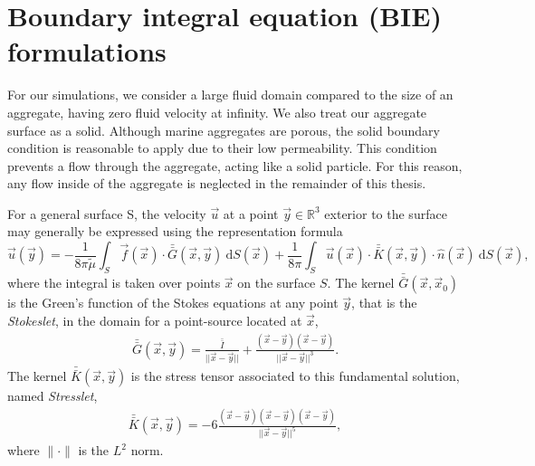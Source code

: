 \section{Boundary integral equation (BIE) formulations} 
For our simulations, we consider a large fluid domain compared to the size of an aggregate, having zero fluid velocity at infinity. We also treat our aggregate surface as a solid. Although marine aggregates are porous, the solid boundary condition is reasonable to apply due to their low permeability. 
This condition prevents a flow through the aggregate, acting like a solid particle. For this reason, any flow inside of the aggregate is neglected in the remainder of this thesis.  
\par
For a general surface S, the velocity $\vec{u}$ at a point $\vec{y}\in \mathbb{R}^3$ exterior to the surface may generally be expressed using the representation formula \cite{pozrikidis_boundary_1992}
\begin{equation}
   \vec{u}(\vec{y}) =
	- \frac{1}{8 \pi {\tilde{\mu}}} \int_S  \vec{f}(\vec{x}) \cdot \bar{\bar{G}}(\vec{x},\vec{y}) \ \text{d}S(\vec{x}) 
+ \frac{1}{8 \pi} \int_S
\vec{u}(\vec{x}) \cdot  \bar{\bar{K}}(\vec{x},\vec{y})  
\cdot \hat{n} ( \vec{x})
\ \text{d}S(\vec{x}),
\label{eq_BIE}
\end{equation}
where the integral is taken over points $\vec{x}$ on the surface $S$.
The kernel $\bar{\bar{G}}(\vec{x},\vec{x}_0)$ is the Green's function of the Stokes equations at any point $\vec{y}$, that is the {\textit{Stokeslet}}, in the domain for a point-source located at $\vec{x}$,
\begin{align}
  \bar{\bar{G}}(\vec{x},\vec{y}) =   
  \frac{\bar{\bar{I}}}{||\vec{x}-\vec{y}||} + \frac{(\vec{x}-\vec{y})(\vec{x}-\vec{y})}{||\vec{x}-\vec{y}||^3}.
  \label{eq_stokeslet}
  \end{align}
  The kernel  $\bar{\bar{K}}(\vec{x},\vec{y})$ is the stress tensor associated to this fundamental solution, named {\textit{Stresslet}},
  \begin{align}
  \bar{\bar{K}}(\vec{x},\vec{y}) = 
  -6\frac{(\vec{x}-\vec{y})(\vec{x}-\vec{y}) (\vec{x}-\vec{y})}{||\vec{x}-\vec{y}||^5},
  \label{eq_stresslet}
  \end{align}
where $\| \cdot \|$ is the $L^2$ norm. 
